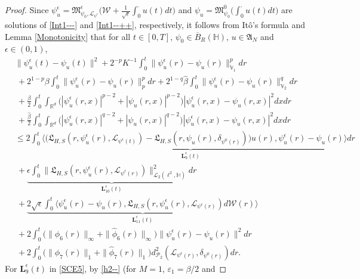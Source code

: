 \documentclass[10pt,a4paper]{amsart}
\renewcommand{\leq}{\leqslant}
\begin{document}
\begin{proof}
Since $\psi^\epsilon_u=
\mathfrak{M}_{\psi_0,\mathcal{L}_{
\psi^\epsilon}}^\epsilon
\big(\mathcal{W}+\frac{1}{\sqrt{\epsilon}}
\int_0^\cdot u(t)dt\big)$ and $\psi_u=
\mathfrak{M}_{\psi_0}^0
\big(
\int_0^\cdot u(t)dt\big)$ are solutions of \eqref{Int1---} and \eqref{Int1--++}, respectively,
it follows from  It\^{o}'s
formula and
 Lemma \ref{Monotonicity} that for all $t\in[0,T]$, $\psi_{0}\in \overline{B}_{R}(\mathbb{H})$,
$u\in \mathfrak{A}_N$ and $\epsilon\in(0,1)$,
\begin{align}\label{SCE5}
&\|\psi^\epsilon_u(t)
-\psi_u(t)
\|^2+2^{-p}K^{-1}\int_0^{t}
\|\psi^\epsilon_u(r)
-\psi_u(r)\|^p_{\dot{\mathbb{V}}_1}dr
\nonumber\\&\ +2^{1-p}\beta
\int_0^{t}
\|\psi^\epsilon_u(r)
-\psi_u(r)\|_{p}^{p}dr
+2^{1-q}\widehat{\beta}
\int_0^{t}\|\psi^\epsilon_u(r)
-\psi_u(r)\|_{\mathbb{V}_2}^{q}dr
\nonumber\\&\ +\frac{\beta}{2}\int_0^{t} \int_{\mathbb{R}^d}  \big(|\psi^\epsilon_u(r,x)|^{p-2}
+|\psi_u(r,x)|^{p-2}\big)
|\psi^\epsilon_u(r,x)-\psi_u(r,x)|^2dxdr
\nonumber\\&\ +\frac{\widehat{\beta}}{2}
\int_0^{t} \int_{\mathbb{R}^d}  \big(|\psi^\epsilon_u(r,x)|^{q-2}
+|\psi_u(r,x)|^{q-2}\big)
|\psi^\epsilon_u(r,x)-\psi_u(r,x)|^2dxdr
\nonumber\\&\leq
\underbrace{2
\int_0^{t}\big\langle
    \big(\mathfrak{L}_{H,S}(r,\psi^\epsilon_u(r),
\mathcal{L}_{
\psi^\epsilon(t)}) - \mathfrak{L}_{H,S}(r,\psi_u(r),
\delta_{\psi^0(r)})\big)u(r) ,\psi^\epsilon_u(r)
-\psi_u(r)
\big\rangle dr}_{\textbf{L}^\epsilon_9(t)}
\nonumber\\&\ +\underbrace{\epsilon\int_0^{t}
\|\mathfrak{L}_{H,S}(r,\psi^\epsilon_u(r),
\mathcal{L}_{
\psi^\epsilon(r)})
		\|^2_{\mathcal{L}_2(\ell^2,
			\mathbb{H})}dr}_{\textbf{L}^\epsilon_{10}(t)}
\nonumber\\&\ +\underbrace{2\sqrt{\epsilon}
\int_0^{t}\langle
    \psi^\epsilon_u(r)
-\psi_u(r),\mathfrak{L}_{H,S}(r,
\psi^\epsilon_u(r),
\mathcal{L}_{
\psi^\epsilon(r)})d\mathcal{W}(r)
\rangle}_{\textbf{L}^\epsilon_{11}(t)}
\nonumber\\&\ +
2\int_0^{t}
\big(\|\phi_6(r)\|_{\infty}+
\|\widehat{\phi}_6(r)\|_{\infty}\big)
\| \psi^\epsilon_u(r)
-\psi_u(r)
\|^2dr
\nonumber\\&\ +2\int_0^{t}
\big(\|\phi_7(r)\|_{1}+
\|\widehat{\phi}_7(r)\|_{1}\big)
d_{\mathcal{P}_2}^2
(\mathcal{L}_{
\psi^\epsilon(r)},\delta_{\psi^0(r)})dr.
\end{align}
For   $\textbf{L}^\epsilon_{9}(t)$ in \eqref{SCE5}, by \eqref{h2--} (for $M=1$, $\varepsilon_1=\beta/2$ and

\end{proof}
\end{document}
